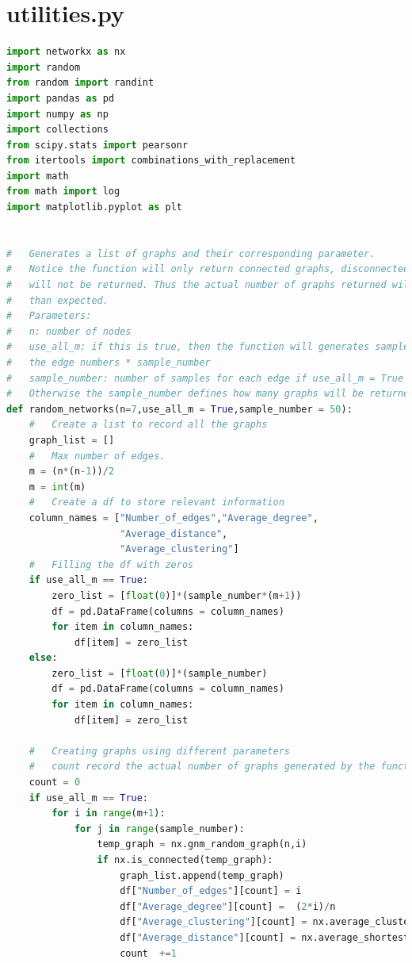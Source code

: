 \documentclass[12pt]{article}
\begin{document}
\appendix


\section{utilities.py}
\label{utilities_code}
\begin{lstlisting}[language=Python,breaklines=true]
import networkx as nx
import random
from random import randint
import pandas as pd
import numpy as np
import collections
from scipy.stats import pearsonr
from itertools import combinations_with_replacement
import math
from math import log
import matplotlib.pyplot as plt


#   Generates a list of graphs and their corresponding parameter.
#   Notice the function will only return connected graphs, disconnected graphs
#   will not be returned. Thus the actual number of graphs returned will be less
#   than expected.
#   Parameters:
#   n: number of nodes
#   use_all_m: if this is true, then the function will generates samples using all
#   the edge numbers * sample_number
#   sample_number: number of samples for each edge if use_all_m = True
#   Otherwise the sample_number defines how many graphs will be returned in total
def random_networks(n=7,use_all_m = True,sample_number = 50):
    #   Create a list to record all the graphs
    graph_list = []
    #   Max number of edges.
    m = (n*(n-1))/2
    m = int(m)
    #   Create a df to store relevant information
    column_names = ["Number_of_edges","Average_degree",
                    "Average_distance",
                    "Average_clustering"]
    #   Filling the df with zeros
    if use_all_m == True:
        zero_list = [float(0)]*(sample_number*(m+1))
        df = pd.DataFrame(columns = column_names)
        for item in column_names:
            df[item] = zero_list 
    else:
        zero_list = [float(0)]*(sample_number)
        df = pd.DataFrame(columns = column_names)
        for item in column_names:
            df[item] = zero_list 
    
    #   Creating graphs using different parameters
    #   count record the actual number of graphs generated by the function
    count = 0
    if use_all_m == True:
        for i in range(m+1):
            for j in range(sample_number):
                temp_graph = nx.gnm_random_graph(n,i)
                if nx.is_connected(temp_graph):
                    graph_list.append(temp_graph)
                    df["Number_of_edges"][count] = i
                    df["Average_degree"][count] =  (2*i)/n
                    df["Average_clustering"][count] = nx.average_clustering(temp_graph)
                    df["Average_distance"][count] = nx.average_shortest_path_length(temp_graph)
                    count  +=1


\end{lstlisting}
\end{document}
